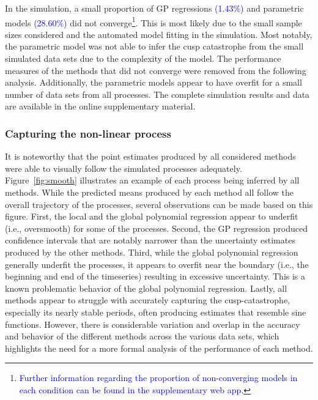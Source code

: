 \documentclass[man, floatsintext]{apa7}
\begin{document}
In the simulation, a small proportion of GP regressions
\textcolor{blue}{(1.43\%)} and parametric models \textcolor{blue}{(28.60\%)}
did not converge\footnote{\textcolor{blue}{Further information regarding the
    proportion of non-converging models in each condition can be found in the
    supplementary web app.}}. This is most likely due to the small
sample
sizes considered
and the automated model fitting in the simulation. Most notably, the parametric
model was not able to infer the cusp catastrophe from the small simulated data
sets due to the complexity of the model. The performance measures of the
methods that did not converge were removed from the following analysis.
Additionally, the parametric models appear to have overfit for a small number
of data sets from all processes. The complete simulation results and data are
available in the online supplementary material.

\subsubsection{Capturing the non-linear process}

It is noteworthy that the point estimates produced by all considered methods
were able to visually follow the simulated processes adequately.
Figure~\ref{fig:smooth} illustrates an example of each process being inferred
by all methods. While the predicted means produced by each method all follow
the overall trajectory of the processes, several observations can be made based
on this figure. First, the local and the global polynomial regression appear to
underfit (i.e., oversmooth) for some of the processes. Second, the GP
regression produced confidence intervals that are notably narrower than the
uncertainty estimates produced by the other methods. Third, while the global
polynomial regression generally underfit the processes, it appears to overfit
near the boundary (i.e., the beginning and end of the timeseries) resulting in
excessive uncertainty. This is a known problematic behavior of the global
polynomial regression. Lastly, all methods appear to struggle with accurately
capturing the cusp-catastrophe, especially its nearly stable periods, often
producing estimates that resemble sine functions. However, there is
considerable variation and overlap in the accuracy and behavior of the
different methods across the various data sets, which highlights the need for a
more formal analysis of the performance of each method.
\end{document}
